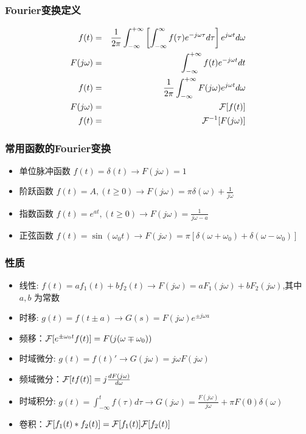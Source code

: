 \documentclass{beamer}
\begin{document}
\begin{frame}
\frametitle{Fourier变换定义}
\label{sec-5-4}

\begin{eqnarray*}
f(t)& = &\frac{1}{2\pi}\int_{-\infty}^{+\infty}\left[ \int_{-\infty }^{\infty}f(\tau)e^{-j\omega\tau}d\tau\right]e^{j\omega t}d\omega \\
F(j\omega)&=& \int_{-\infty}^{ + \infty}f(t)e^{-j\omega t}dt \\
f(t)  & =& \frac{1}{2\pi} \int_{-\infty}^{+\infty}F(j\omega)e^{j\omega t}d\omega \\
F(j\omega) &=& {\cal F}[f(t)] \\
f(t) &=& {\cal F}^{-1}[F(j\omega)] 
\end{eqnarray*}
\end{frame}
\begin{frame}
\frametitle{常用函数的Fourier变换}
\label{sec-5-5}

\begin{itemize}
\item 单位脉冲函数 $f(t)=\delta(t) \rightarrow   F(j\omega)=1$
\item 阶跃函数 $f(t)=A,(t\geq 0) \rightarrow   F(j\omega)=\pi\delta(\omega)+\frac{1}{j\omega}$
\item 指数函数 $f(t)=e^{at},(t\geq 0) \rightarrow  F(j\omega)=\frac{1}{j\omega-a}$
\item 正弦函数 $f(t)=\sin(\omega_0 t)\rightarrow F(j\omega)=\pi[\delta(\omega+\omega_0)+\delta(\omega-\omega_0)]$
\end{itemize}
\end{frame}
\begin{frame}
\frametitle{性质}
\label{sec-5-6}

\begin{itemize}
\item 线性: $f(t)=af_1(t)+bf_2(t)\rightarrow  F(j\omega)=aF_1(j\omega)+bF_2(j\omega)$,其中 $a,b$ 为常数
\item 时移: $g(t)=f(t\pm a) \rightarrow  G(s)=F(j\omega)e^{\pm j\omega a}$
\item 频移：${\cal F}[e^{\pm\omega_0 t}f(t)]=F(j(\omega\mp\omega_0))$
\item 时域微分: $g(t)=f(t)'\rightarrow  G(j\omega)=j\omega F(j\omega)$
\item 频域微分：${\cal F}[tf(t)]=j\frac{dF(j\omega)}{d\omega}$
\item 时域积分: $g(t)=\int_{-\infty}^{t} f(\tau) d\tau \rightarrow  G(j\omega)=\frac{F(j\omega)}{j\omega}+\pi F(0)\delta(\omega)$
\item 卷积：${\cal F}[f_1(t)*f_2(t)]={\cal F}[f_1(t)]{\cal F}[f_2(t)]$
\end{itemize}
\end{frame}
\end{document}
